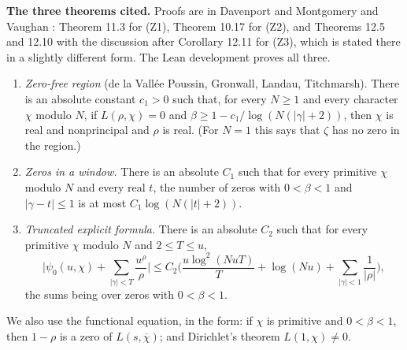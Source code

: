 \documentclass[11pt,letterpaper]{article}
\begin{document}
\textbf{The three theorems cited.} Proofs are in Davenport \cite[Ch.~14, 16, 19]{Dav00} and Montgomery and
Vaughan \cite{MV07}: Theorem 11.3 for (Z1), Theorem 10.17 for (Z2), and Theorems 12.5 and 12.10 with the
discussion after Corollary 12.11 for (Z3), which is stated there in a slightly different form. The Lean development proves all three.
\begin{enumerate}[label=\textup{(Z\arabic*)},leftmargin=2.6em]
\item \emph{Zero-free region} (de la Vall\'ee Poussin, Gronwall, Landau, Titchmarsh). There is an absolute
constant $c_1>0$ such that, for every $N\ge1$ and every character $\chi$ modulo $N$, if $L(\rho,\chi)=0$ and
$\beta\ge1-c_1/\log(N(|\gamma|+2))$, then $\chi$ is real and nonprincipal and $\rho$ is real. (For $N=1$ this
says that $\zeta$ has no zero in the region.)
\item \emph{Zeros in a window.} There is an absolute $C_1$ such that for every primitive $\chi$ modulo $N$ and
every real $t$, the number of zeros with $0<\beta<1$ and $|\gamma-t|\le1$ is at most $C_1\log(N(|t|+2))$.
\item \emph{Truncated explicit formula.} There is an absolute $C_2$ such that for every primitive $\chi$
modulo $N$ and $2\le T\le u$,
\begin{equation}\label{D:132}
 \Big|\psi_0(u,\chi)+\sum_{|\gamma|<T}\frac{u^\rho}{\rho}\Big|
 \le C_2\Big(\frac{u\log^2(NuT)}{T}+\log(Nu)+\sum_{|\gamma|<1}\frac1{|\rho|}\Big),
\end{equation}
the sums being over zeros with $0<\beta<1$.
\end{enumerate}
We also use the functional equation, in the form: if $\chi$ is primitive and $0<\beta<1$, then $1-\rho$ is a
zero of $L(s,\overline\chi)$; and Dirichlet's theorem $L(1,\chi)\ne0$.
\end{document}
